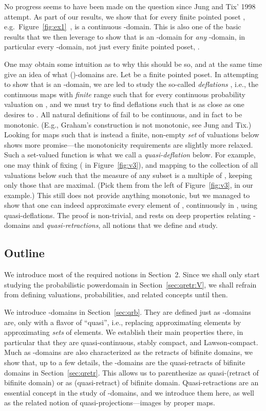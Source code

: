 \documentclass{LMCS}
\begin{document}
No progress seems to have been made on the question since Jung and
Tix' 1998 attempt.  As part of our results, we show that for every
finite pointed poset , e.g.\ Figure~\ref{fig:ex1}~,  is a continuous -domain.
This is also one of the basic results that we then leverage to show
that  is an -domain for {\em any\/}
-domain, in particular every -domain, not just every
finite pointed poset, .



One may obtain some intuition as to why this should be so, and at the
same time give an idea of what ()-domains are.  Let 
be a finite pointed poset.  In attempting to show that  is
an -domain, we are led to study the so-called {\em deflations\/}
, i.e., the continuous maps  with
{\em finite\/} range such that  for every continuous
probability valuation  on , and we must try to find deflations
 such that  is as close as one desires to .  All
natural definitions of  fail to be continuous, and in fact to be
monotonic.  (E.g., Graham's construction \cite{Graham:rb:V} is not
monotonic, see Jung and Tix.)  Looking for maps  such that  is instead a finite, non-empty {\em set\/} of valuations below
 shows more promise---the monotonicity requirements are slightly
more relaxed.  Such a set-valued function is what we call a {\em
  quasi-deflation\/} below.  For example, one may think of fixing  ( in Figure~\ref{fig:v3}), and mapping  to the
collection of all valuations  below  such that the measure
of any subset is a multiple of , keeping only those  that
are maximal.  (Pick them from the left of Figure~\ref{fig:v3}, in our
example.)  This still does not provide anything monotonic, but we
managed to show that one can indeed approximate every element  of
, continuously in , using quasi-deflations.  The
proof is non-trivial, and rests on deep properties relating
-domains and \emph{quasi-retractions}, all notions that we
define and study.



\subsection{Outline}

We introduce most of the required notions in Section~2.  Since we
shall only start studying the probabilistic powerdomain in
Section~\ref{sec:qretr:V}, we shall refrain from defining valuations,
probabilities, and related concepts until then.

We introduce -domains in Section~\ref{sec:qrb}.  They are
defined just as -domains are, only with a flavor of ``quasi'',
i.e., replacing approximating elements by approximating {\em sets\/}
of elements.  We establish their main properties there, in particular
that they are quasi-continuous, stably compact, and Lawson-compact.
Much as -domains are also characterized as the retracts of
bifinite domains, we show that, up to a few details, the
-domains are the quasi-retracts of bifinite domains in
Section~\ref{sec:qretr}.  This allows us to parenthesize  as
quasi-(retract of bifinite domain) or as (quasi-retract) of bifinite
domain.  Quasi-retractions are an essential concept in the study of
-domains, and we introduce them here, as well as the related
notion of quasi-projections---images by proper maps.
\end{document}
